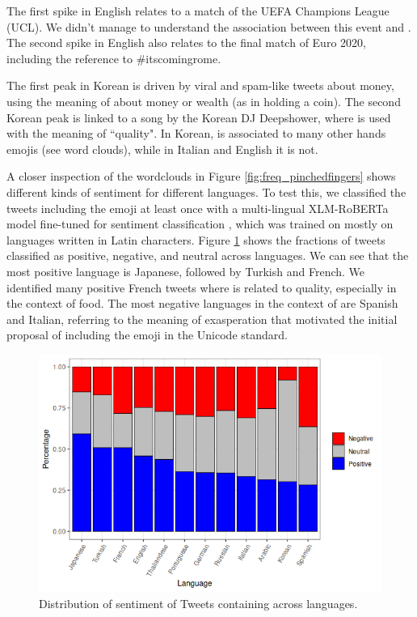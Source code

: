 \documentclass{article}
\begin{document}
The first spike in English relates to a match of the UEFA Champions League (UCL). We didn't manage to understand the association between this event and . The second spike in English also relates to the final match of Euro 2020, including the reference to \#itscomingrome. 

The first peak in Korean is driven by viral and spam-like tweets about money, using the meaning of  about money or wealth (as in holding a coin). The second Korean peak is linked to a song by the Korean DJ Deepshower, where  is used with the meaning of ``quality". In Korean,  is associated to many other hands emojis (see word clouds), while in Italian and English it is not.

A closer inspection of the wordclouds in Figure \ref{fig:freq_pinchedfingers} shows different kinds of sentiment for different languages. To test this, we classified the tweets including the emoji at least once with a multi-lingual XLM-RoBERTa model fine-tuned for sentiment classification \cite{barbieri2021xlmtwitter}, which was trained on mostly on languages written in Latin characters. Figure \ref{fig:sentiment} shows the fractions of tweets classified as positive, negative, and neutral across languages. We can see that the most positive language is Japanese, followed by Turkish and French. We identified many positive French tweets where   is related to quality, especially in the context of food. The most negative languages in the context of  are Spanish and Italian, referring to the meaning of exasperation that motivated the initial proposal of including the emoji in the Unicode standard.


\begin{figure}
    \centering
    \includegraphics[width=.8\linewidth]{Plots/sentiment.png}
    \caption{Distribution of sentiment of Tweets containing  across languages.}
    \label{fig:sentiment}
\end{figure}
\end{document}
